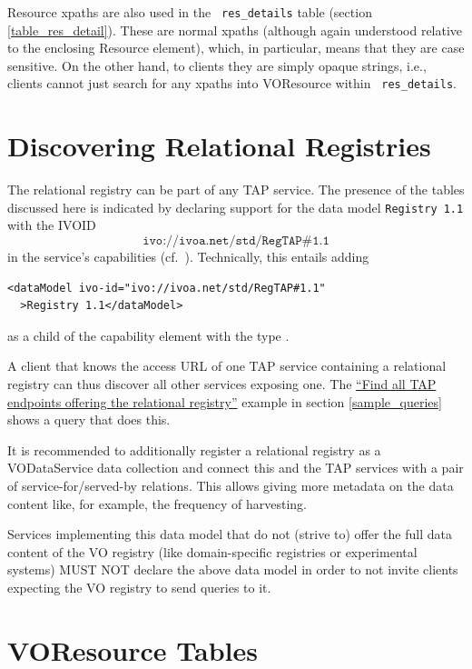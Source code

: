 \documentclass[11pt,a4paper]{ivoa}
\newcommand{\rtent}[1]{\texttt{\color{rtcolor} #1}}
\begin{document}
Resource xpaths are also used in the \rtent{res\_details} table (section
\ref{table_res_detail}).  These are normal xpaths
(although again understood relative to the enclosing Resource element),
which, in particular, means that they are case sensitive.  On the other
hand, to clients they are simply opaque strings, i.e., clients cannot
just search for any xpaths into VOResource within \rtent{res\_details}.



\section{Discovering Relational Registries}

\label{registration}

The relational registry can be part of any TAP service.  The presence
of the tables discussed here is indicated by declaring support for the
data model \texttt{Registry 1.1} with the IVOID
$$\texttt{ivo://ivoa.net/std/RegTAP\#1.1}$$ in the service's
capabilities (cf.~\citet{std:TAPREGEXT}).  Technically, this
entails adding


\begin{verbatim}
<dataModel ivo-id="ivo://ivoa.net/std/RegTAP#1.1"
  >Registry 1.1</dataModel>
\end{verbatim}

as a child of the capability element with the type
.

A client that knows the access URL of one TAP service containing 
a relational
registry can thus discover all other services exposing one. The \href{#example-findregtap}{``Find all TAP endpoints offering the
relational registry''} example in section
\ref{sample_queries} shows a query that does
this.

It is recommended to additionally register a relational registry as a
VODataService data collection and connect this and the TAP services
with a pair of service-for/served-by relations.  This allows giving more
metadata on the data content like, for example, the frequency of
harvesting.

Services implementing this data model that do not (strive to) offer
the full data content of the VO registry (like domain-specific
registries or experimental systems) MUST NOT declare the above data
model in order to not invite clients expecting the VO registry to send
queries to it.



\section{VOResource Tables}
\end{document}
